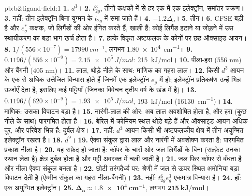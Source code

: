 \begin{solution}{pb:b2:ligand-field:1}
\textbf{1.} $d^3$।
\textbf{2.} $t_{2g}^3$, तीनों कक्षकों में से हर एक में एक इलेक्ट्रॉन, समांतर चक्रण।
\textbf{3.} नहीं: तीन इलेक्ट्रॉन बिना युग्मन के $t_{2g}$ में समा जाते हैं।
\textbf{4.} $-1.2\Delta_o$।
\textbf{5.} तीन।
\textbf{6.} CFSE बड़ी है और $e_g^*$ कक्षक, जो लिगैंडों की ओर इंगित करते हैं,
खाली हैं: कोई लिगैंड हटाने या जोड़ने में उस स्थायीकरण का बड़ा भाग खर्च होता है।
\textbf{7.} हल्के विकृत अष्टफलक के कोनों पर छह ऑक्साइड आयन।
\textbf{8.} $1/(556 \times 10^{-7}) = \qty{17990}{cm^{-1}}$, लगभग \qty{1.80e4}{cm^{-1}}।
\textbf{9.} $0.1196/(556 \times 10^{-9}) = \qty{2.15e5}{J/mol}$: \qty{215}{kJ/mol}।
\textbf{10.} पीला-हरा (556 nm) और बैंगनी (405 nm)।
\textbf{11.} लाल, थोड़े नीले के साथ: माणिक का गहरा लाल।
\textbf{12.} किसी $d^3$ आयन के एक से अधिक उत्तेजित विन्यास होते हैं जिनमें एक इलेक्ट्रॉन $e_g$ में हो;
इलेक्ट्रॉन प्रतिकर्षण उन्हें भिन्न ऊर्जाएँ देता है, इसलिए कई पट्टियाँ (जिनका विवेचन
तृतीय वर्ष के खंड में है)।
\textbf{13.} $0.1196/(620 \times 10^{-9}) = \qty{1.93e5}{J/mol}$, \qty{193}{kJ/mol}
(\qty{16130}{cm^{-1}})।
\textbf{14.} माणिक: उसका विपाटन बड़ा है।
\textbf{15.} नारंगी-लाल की ओर: अब लाल अवशोषित होता है, और हरा (कुछ नीले के साथ) पारगमित होता है।
\textbf{16.} बेरिल में क्रोमियम स्थल थोड़े बड़े हैं और ऑक्साइड आयन अधिक दूर,
और परिवेश भिन्न है: दुर्बल क्षेत्र।
\textbf{17.} नहीं: $d^3$ आयन किसी भी अष्टफलकीय क्षेत्र में तीन अयुग्मित इलेक्ट्रॉन रखता है।
\textbf{18.} $d^9$।
\textbf{19.} ऐक्वा संकुल  द्वारा लाल और नारंगी में अवशोषण करता है:
पारगमित प्रकाश नीला है।
\textbf{20.} यह सफ़ेद हो जाता है: कॉपर के चारों ओर जल लिगैंडों के बिना (सल्फ़ेट उनका
स्थान लेता है) क्षेत्र दुर्बल होता है और पट्टी अवरक्त में चली जाती है।
\textbf{21.} जल फिर कॉपर से बँधता है और नीला ऐक्वा संकुल बनता है।
\textbf{22.} छोटी तरंगदैर्ध्य पर: श्रेणी में जल से ऊपर स्थित अमोनिया बड़ा
विपाटन देती है (ऐम्मीन संकुल का गहरा नीला-बैंगनी)।
\textbf{23.} नहीं: $t_{2g}^6e_g^3$ एकमात्र विन्यास है।
\textbf{24.} हाँ: एक अयुग्मित इलेक्ट्रॉन।
\textbf{25.} $\boldsymbol{\Delta_o \approx \qty{1.8e4}{cm^{-1}}}$, लगभग
$\boldsymbol{\qty{215}{kJ/mol}}$।
\end{solution}
